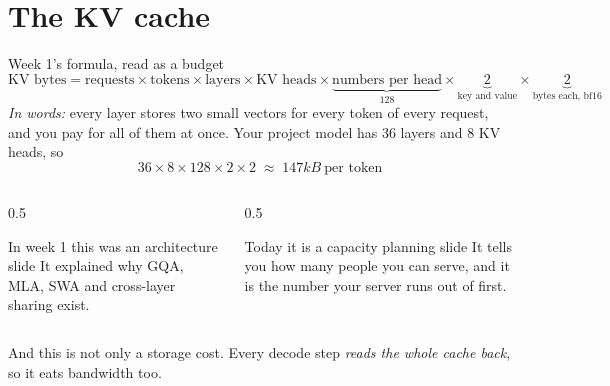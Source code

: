 \documentclass[aspectratio=169,10pt]{beamer}
\begin{document}
\section{The KV cache}

\begin{frame}{Week 1's formula, read as a budget}
  \small
  \[
    \text{KV bytes} = \text{requests} \times \text{tokens} \times
    \text{layers} \times \text{KV heads} \times
    \underbrace{\text{numbers per head}}_{128} \times
    \underbrace{2}_{\text{key and value}} \times
    \underbrace{2}_{\text{bytes each, bf16}}
  \]
  \normalsize
  \emph{In words:} every layer stores two small vectors for every token of
  every request, and you pay for all of them at once.
  Your project model has 36 layers and 8 KV heads, so
  \[
    36 \times 8 \times 128 \times 2 \times 2 \;\approx\;
    147\unit{kB}\ \text{per token}
  \]
  \vspace{-0.3em}
  \begin{columns}[T]
    \begin{column}{0.5\textwidth}
      \begin{block}{In week 1 this was an architecture slide}
        \small
        It explained why GQA, MLA, SWA and cross-layer sharing exist.
      \end{block}
    \end{column}
    \begin{column}{0.5\textwidth}
      \begin{block}{Today it is a capacity planning slide}
        \small
        It tells you how many people you can serve, and it is the number your
        server runs out of first.
      \end{block}
    \end{column}
  \end{columns}
  \vspace{0.4em}
  \centering
  \small
  And this is not only a storage cost. Every decode step \emph{reads the whole
  cache back}, so it eats bandwidth too.
\end{frame}
\end{document}

